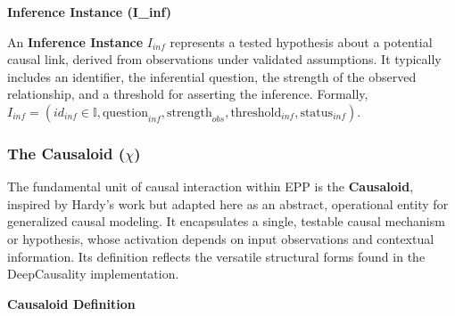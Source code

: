 \textbf{Inference Instance (I\_inf)}

An \textbf{Inference Instance} \(I_{inf}\) represents a tested hypothesis about a potential causal link, derived from observations under validated assumptions. It typically includes an identifier, the inferential question, the strength of the observed relationship, and a threshold for asserting the inference. Formally, \(I_{inf} = (id_{inf} \in \mathbb{I}, \text{question}_{inf}, \text{strength}_{obs}, \text{threshold}_{inf}, \text{status}_{inf})\).


\subsubsection[The Causaloid (chi)]{The Causaloid (\(\chi\))}
\label{ssec:causaloid_formal}

The fundamental unit of causal interaction within EPP is the \textbf{Causaloid}, inspired by Hardy's work \cite{HardyDynamicCausalStructure} but adapted here as an abstract, operational entity for generalized causal modeling. It encapsulates a single, testable causal mechanism or hypothesis, whose activation depends on input observations and contextual information. Its definition reflects the versatile structural forms found in the DeepCausality implementation.

\textbf{Causaloid Definition}


